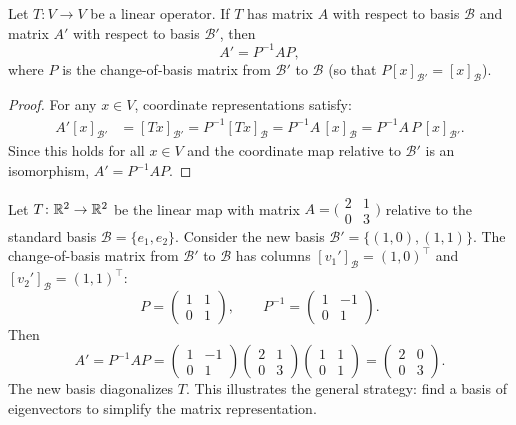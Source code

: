 \documentclass[11pt,a4paper]{article}
\begin{document}
\begin{proposition}
\label{prop:similarity}
Let $T\colon V \to V$ be a linear operator.  If $T$ has matrix $A$ with respect
to basis $\mathcal{B}$ and matrix $A'$ with respect to basis $\mathcal{B}'$,
then
\[
  A' = P^{-1} A P,
\]
where $P$ is the change-of-basis matrix from $\mathcal{B}'$ to $\mathcal{B}$
(so that $P[x]_{\mathcal{B}'} = [x]_{\mathcal{B}}$).
\end{proposition}

\begin{proof}
For any $x \in V$, coordinate representations satisfy:
\begin{align*}
  A'[x]_{\mathcal{B}'}
  &= [Tx]_{\mathcal{B}'}
   = P^{-1}[Tx]_{\mathcal{B}}
   = P^{-1} A\, [x]_{\mathcal{B}}
   = P^{-1} A\, P\, [x]_{\mathcal{B}'}.
\end{align*}
Since this holds for all $x \in V$ and the coordinate map relative to
$\mathcal{B}'$ is an isomorphism, $A' = P^{-1}AP$.
\end{proof}

\begin{example}
\label{ex:change_basis_R2}
Let $T\colon \mathbb{R}^2 \to \mathbb{R}^2$ be the linear map with matrix
$A = \bigl(\begin{smallmatrix} 2 & 1 \\ 0 & 3 \end{smallmatrix}\bigr)$
relative to the standard basis $\mathcal{B} = \{e_1, e_2\}$.
Consider the new basis $\mathcal{B}' = \{(1,0), (1,1)\}$.  The change-of-basis
matrix from $\mathcal{B}'$ to $\mathcal{B}$ has columns
$[v_1']_{\mathcal{B}} = (1,0)^\top$ and $[v_2']_{\mathcal{B}} = (1,1)^\top$:
\[
  P = \begin{pmatrix} 1 & 1 \\ 0 & 1 \end{pmatrix}, \qquad
  P^{-1} = \begin{pmatrix} 1 & -1 \\ 0 & 1 \end{pmatrix}.
\]
Then
\[
  A' = P^{-1}AP
  = \begin{pmatrix} 1 & -1 \\ 0 & 1 \end{pmatrix}
    \begin{pmatrix} 2 & 1 \\ 0 & 3 \end{pmatrix}
    \begin{pmatrix} 1 & 1 \\ 0 & 1 \end{pmatrix}
  = \begin{pmatrix} 2 & 0 \\ 0 & 3 \end{pmatrix}.
\]
The new basis diagonalizes $T$.  This illustrates the general strategy:
find a basis of eigenvectors to simplify the matrix representation.
\end{example}
\end{document}
